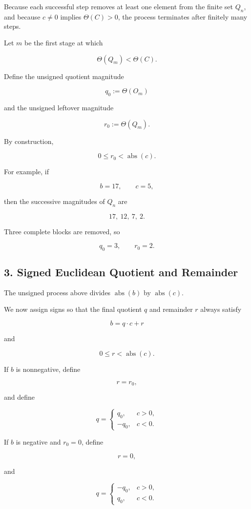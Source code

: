 \documentclass[12pt]{article}
\begin{document}
Because each successful step removes at least one element from the finite set \(Q_n\), and because \(c\neq0\) implies \(\Theta(C)>0\), the process terminates after finitely many steps.

Let \(m\) be the first stage at which

\[
\Theta(Q_m)<\Theta(C).
\]

Define the unsigned quotient magnitude

\[
\boxed{
q_0:=\Theta(O_m)
}
\]

and the unsigned leftover magnitude

\[
\boxed{
r_0:=\Theta(Q_m).
}
\]

By construction,

\[
0\leq r_0<\operatorname{abs}(c).
\]

For example, if

\[
b=17,
\qquad
c=5,
\]

then the successive magnitudes of \(Q_n\) are

\[
17,\ 12,\ 7,\ 2.
\]

Three complete blocks are removed, so

\[
q_0=3,
\qquad
r_0=2.
\]

\subsection*{3. Signed Euclidean Quotient and Remainder}

The unsigned process above divides \(\operatorname{abs}(b)\) by \(\operatorname{abs}(c)\).

We now assign signs so that the final quotient \(q\) and remainder \(r\) always satisfy

\[
\boxed{
b=q\cdot c+r
}
\]

and

\[
\boxed{
0\leq r<\operatorname{abs}(c).
}
\]

If \(b\) is nonnegative, define

\[
r=r_0,
\]

and define

\[
q=
\begin{cases}
q_0, & c>0,\\[4pt]
-q_0, & c<0.
\end{cases}
\]

If \(b\) is negative and \(r_0=0\), define

\[
r=0,
\]

and

\[
q=
\begin{cases}
-q_0, & c>0,\\[4pt]
q_0, & c<0.
\end{cases}
\]
\end{document}
